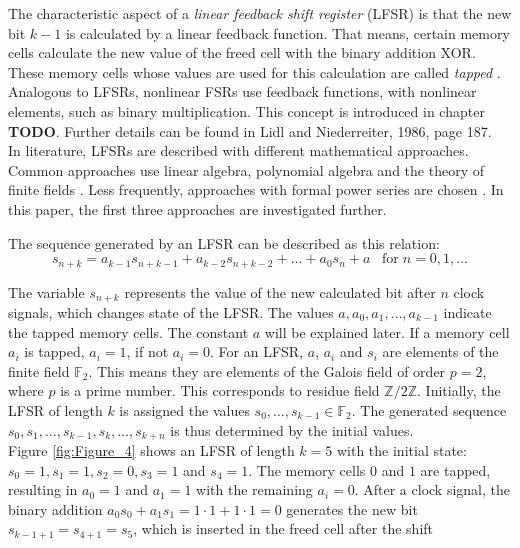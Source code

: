 The characteristic aspect of a \textit{linear feedback shift register} (LFSR) is that the new bit $k-1$ is calculated by a linear feedback function. That means, certain memory cells calculate the new value of the freed cell with the binary addition XOR. \cite[p. 82]{Stamp.2007} These memory cells whose values are used for this calculation are called \textit{tapped} \cite[p. 227]{Smart.2016}. Analogous to LFSRs, nonlinear FSRs use feedback functions, with nonlinear elements, such as binary multiplication. This concept is introduced in chapter \textbf{TODO}. Further details can be found in Lidl and Niederreiter, 1986, page 187. \\

In literature, LFSRs are described with different mathematical approaches. Common approaches use linear algebra, polynomial algebra and the theory of finite fields \cite[pp. 186ff.]{Lidl.1986}\cite[pp. 228ff.]{Smart.2016}. Less frequently, approaches with formal power series are chosen \cite[pp. 53ff.]{Beutelspacher.2005}\cite[pp. 201ff.]{Rueppel.1986}. In this paper, the first three approaches are investigated further. \\

\pagebreak

The sequence generated by an LFSR can be described as this relation:
\begin{equation*}
s_{n+k}=a_{k-1}s_{n+k-1}+a_{k-2}s_{n+k-2}+\ldots+a_0s_n+a \;\;\;\text{for}\; n = 0,1,\ldots
\end{equation*}

The variable $s_{n+k}$ represents the value of the new calculated bit after $n$ clock signals, which changes state of the LFSR. The values $a,a_0,a_1,\ldots,a_{k-1}$ indicate the tapped memory cells. The constant $a$ will be explained later. If a memory cell $a_i$ is tapped, $a_i=1$, if not $a_i=0$. For an LFSR, $a$, $a_i$ and $s_i$ are elements of the finite field $\mathbb{F}_2$. This means they are elements of the Galois field of order $p=2$, where $p$ is a prime number. This corresponds to residue field $\mathbb{Z}/2\mathbb{Z}$. \cite[p. 48]{Lidl.1997} Initially, the LFSR of length $k$ is assigned the values $s_0,\ldots,s_{k-1}\in \mathbb{F}_2$. The generated sequence $s_0,s_1,\ldots,s_{k-1},s_k,\ldots,s_{k+n}$ is thus determined by the initial values. \cite[pp. 186-187]{Lidl.1986} \\

Figure \ref{fig:Figure_4} shows an LFSR of length $k=5$ with the initial state: $s_0=1, s_1=1, s_2=0, s_3=1$ and $s_4=1$. The memory cells $0$ and $1$ are tapped, resulting in $a_0=1$ and $a_1=1$ with the remaining $a_i=0$. After a clock signal, the binary addition $a_0s_0+a_1s_1=1\cdot1+1\cdot1=0$ generates the new bit $s_{k-1+1}=s_{4+1}=s_5$, which is inserted in the freed cell after the shift 

